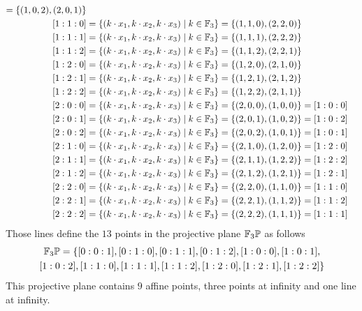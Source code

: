 \begin{example}
\begin{align*}
          = \{(1,0,2), (2,0,1)\}\\
[1:1:0] &= \{(k\cdot x_1,k\cdot x_2, k\cdot x_3)\;|\; k\in\mathbb{F}_3\}
          = \{(1,1,0), (2,2,0)\}\\
[1:1:1] &= \{(k\cdot x_1,k\cdot x_2, k\cdot x_3)\;|\; k\in\mathbb{F}_3\}
          = \{(1,1,1), (2,2,2)\}\\
[1:1:2]&= \{(k\cdot x_1,k\cdot x_2, k\cdot x_3)\;|\; k\in\mathbb{F}_3\}
          = \{(1,1,2), (2,2,1)\}\\
[1:2:0] &= \{(k\cdot x_1,k\cdot x_2, k\cdot x_3)\;|\; k\in\mathbb{F}_3\}
          = \{(1,2,0), (2,1,0)\}\\
[1:2:1] &= \{(k\cdot x_1,k\cdot x_2, k\cdot x_3)\;|\; k\in\mathbb{F}_3\}
          = \{(1,2,1), (2,1,2)\}\\
[1:2:2] &= \{(k\cdot x_1,k\cdot x_2, k\cdot x_3)\;|\; k\in\mathbb{F}_3\}
          = \{(1,2,2), (2,1,1)\}\\
[2:0:0] &= \{(k\cdot x_1,k\cdot x_2, k\cdot x_3)\;|\; k\in\mathbb{F}_3\}
          = \{(2,0,0), (1,0,0)\}
          = [1:0:0]\\
[2:0:1] &= \{(k\cdot x_1,k\cdot x_2, k\cdot x_3)\;|\; k\in\mathbb{F}_3\}
          = \{(2,0,1), (1,0,2)\}
          = [1:0:2]\\
[2:0:2] &= \{(k\cdot x_1,k\cdot x_2, k\cdot x_3)\;|\; k\in\mathbb{F}_3\}
          = \{(2,0,2), (1,0,1)\}
          = [1:0:1]\\
[2:1:0] &= \{(k\cdot x_1,k\cdot x_2, k\cdot x_3)\;|\; k\in\mathbb{F}_3\}
          = \{(2,1,0), (1,2,0)\}
          = [1:2:0]\\
[2:1:1] &= \{(k\cdot x_1,k\cdot x_2, k\cdot x_3)\;|\; k\in\mathbb{F}_3\}
          = \{(2,1,1), (1,2,2)\}
          = [1:2:2]\\
[2:1:2] &= \{(k\cdot x_1,k\cdot x_2, k\cdot x_3)\;|\; k\in\mathbb{F}_3\}
          = \{(2,1,2), (1,2,1)\}
          = [1:2:1]\\
[2:2:0] &= \{(k\cdot x_1,k\cdot x_2, k\cdot x_3)\;|\; k\in\mathbb{F}_3\}
          = \{(2,2,0), (1,1,0)\}
          = [1:1:0]\\
[2:2:1] &= \{(k\cdot x_1,k\cdot x_2, k\cdot x_3)\;|\; k\in\mathbb{F}_3\}
          = \{(2,2,1), (1,1,2)\}
          = [1:1:2]\\
[2:2:2] &= \{(k\cdot x_1,k\cdot x_2, k\cdot x_3)\;|\; k\in\mathbb{F}_3\}
          = \{(2,2,2), (1,1,1)\}
          = [1:1:1]
\end{align*}
Those lines define the $13$ points in the projective plane $\mathbb{F}_3\mathbb{P}$ as follows
\begin{multline*}
\mathbb{F}_3\mathbb{P} = \{ [0:0:1], [0:1:0], [0:1:1], [0:1:2], [1:0:0], [1:0:1], \\ [1:0:2], [1:1:0], [1:1:1], [1:1:2], [1:2:0], [1:2:1], [1:2:2]\}
\end{multline*}
This projective plane contains $9$ affine points, three points at infinity and one line at infinity.


\end{example}
